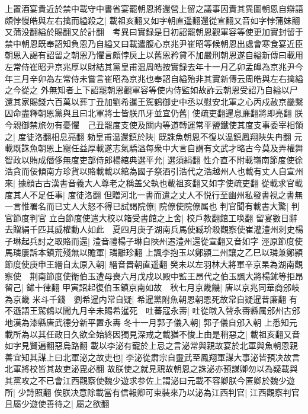 上置酒宴貴近於禁中載守中書省宴罷朝恩將還營上留之議事因責其異圖朝恩自辯語頗悖慢皓與左右擒而縊殺之|{
	載祖亥翻又如字朝直遥翻還從宣翻又音如字悖蒲妹翻又蒲没翻縊於賜翻又於計翻　考異曰實録是日初詔罷朝恩觀軍容等使更加實封留于禁中朝恩既奉詔知負恩乃自縊又曰載遣腹心京兆尹崔昭等候朝恩出處會寒食宴近臣朝恩入謁有詔留之朝恩乃懼言頗悖戾上以舊恩矜貸不加嚴刑朝恩遂自縊新傳曰載用左常侍崔昭尹京兆厚以財結其黨皇甫温周皓按實録去年十一月乙卯孟皥為京兆尹今年三月辛卯為左常侍未嘗言崔昭為京兆也奉詔自縊殆非其實新傳云周皓與左右擒縊之今從之}
外無知者上下詔罷朝恩觀軍容等使内侍監如故詐云朝恩受詔乃自縊以尸還其家賜錢六百萬以葬丁丑加劉希暹王駕鶴御史中丞以慰安北軍之心丙戍赦京畿繫囚命盡釋朝恩黨與且曰北軍將士皆朕爪牙並宜仍舊|{
	使疏吏翻暹息亷翻將即亮翻}
朕今親御禁旅勿有憂懼　己丑罷度支使及關内等道轉運常平鹽鐵使其度支事委宰相領之|{
	度徒洛翻相息亮翻}
勑皇甫温還鎮於陜|{
	既誅魚朝恩不復以温鎮鳳翔陜失冉翻}
元載既誅魚朝恩上寵任益厚載遂志氣驕溢每衆中大言自謂有文武才略古今莫及弄權舞智政以賄成僭侈無度吏部侍郎楊綰典選平允|{
	選須絹翻}
性介直不附載嶺南節度使徐浩貪而佞傾南方珍貨以賂載載以綰為國子祭酒引浩代之浩越州人也載有丈人自宣州來|{
	據顔古古漢書音義大人尊老之稱盖父執也載祖亥翻又如字使疏吏翻}
從載求官載度其人不足任事|{
	度徒洛翻}
但贈河北一書而遣之丈人不悦行至幽州私發書視之書無一言惟署名而已丈人大怒不得已試謁院僚|{
	院僚使院僚属也}
判官聞有載書大驚|{
	判官節度判官}
立白節度使遣大校以箱受書館之上舍|{
	校戶教翻館工唤翻}
留宴數日辭去贈絹千匹其威權動人如此　夏四月庚子湖南兵馬使臧玠殺觀察使崔灌澧州刺史楊子琳起兵討之取賂而還|{
	澧音禮楊子琳自陜州遷澧州還從宣翻又音如字}
涇原節度使馬璘屢訴本鎮荒殘無以贍軍|{
	璘離珍翻}
上諷李抱玉以鄭潁二州讓之乙巳以璘兼鄭頴節度使庚申王縉自太原入朝|{
	縉音晋朝直遥翻}
癸未以左羽林大將軍辛京杲為湖南觀察使　荆南節度使衛伯玉遭母喪六月戊戍以殿中監王昂代之伯玉諷大將楊鉥等拒昂留己|{
	鉥十律翻}
甲寅詔起復伯玉鎮京南如故　秋七月京畿饑|{
	唐以京兆同華商邠岐為京畿}
米斗千錢　劉希暹内常自疑|{
	希暹黨附魚朝恩朝恩死故常自疑暹昔廉翻}
有不遜語王駕鶴以聞九月辛未賜希暹死　吐蕃寇永壽|{
	吐從暾入聲永夀縣属邠州古邠地漢為漆縣唐武德分新平置永夀}
冬十一月郭子儀入朝|{
	郭子儀自邠入朝}
上悉知元載所為以其任政日久欲全始終因獨見深戒之載猶不悛上由是稍惡之|{
	載祖亥翻又音如字見賢遍翻惡烏路翻}
載以李泌有寵於上忌之言泌常與親故宴於北軍與魚朝恩親善宜知其謀上曰北軍泌之故吏也|{
	李泌從肅宗自靈武至鳳翔軍謀大事泌皆預决故言北軍將校皆其故吏泌毘必翻}
故朕使之就見親故朝恩之誅泌亦預謀卿勿以為疑載與其黨攻之不已會江西觀察使魏少遊求参佐上謂泌曰元載不容卿朕今匿卿於魏少遊所|{
	少詩照翻}
俟朕决意除載當有信報卿可束裝來乃以泌為江西判官|{
	江西觀察判官}
且屬少遊使善待之|{
	屬之欲翻}



